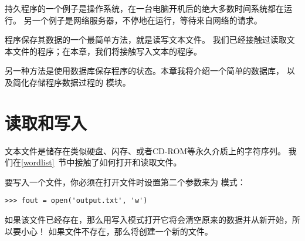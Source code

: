持久程序的一个例子是操作系统，在一台电脑开机后的绝大多数时间系统都在运行。
另一个例子是网络服务器，不停地在运行，等待来自网络的请求。


程序保存其数据的一个最简单方法，就是读写文本文件。
我们已经接触过读取文本文件的程序；在本章，我们将接触写入文本的程序。


另一种方法是使用数据库保存程序的状态。本章我将介绍一个简单的数据库，
以及简化存储程序数据过程的  模块。
  


\section{读取和写入}


文本文件是储存在类似硬盘、闪存、或者CD-ROM等永久介质上的字符序列。
我们在\ref{wordlist}~节中接触了如何打开和读取文件。
  


要写入一个文件，你必须在打开文件时设置第二个参数来为  模式：

\begin{lstlisting}
>>> fout = open('output.txt', 'w')
\end{lstlisting}

%

如果该文件已经存在，那么用写入模式打开它将会清空原来的数据并从新开始，所以要小心！
如果文件不存在，那么将创建一个新的文件。

